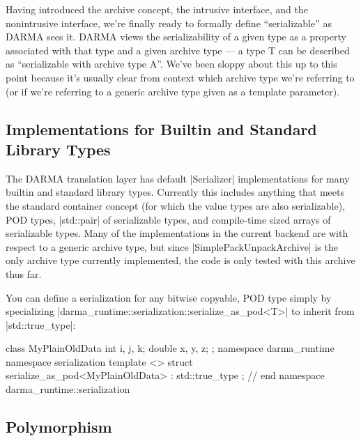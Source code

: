 Having introduced the archive concept, the intrusive interface, and the
nonintrusive interface, we're finally ready to formally define ``serializable''
as DARMA sees it.  DARMA views the serializability of a given type as a property
associated with that type and a given archive type --- a type T can be described
as ``serializable with archive type A''.  We've been sloppy about this up to
this point because it's usually clear from context which archive type we're
referring to (or if we're referring to a generic archive type given as a
template parameter).  

\subsection{Implementations for Builtin and Standard Library Types}

The DARMA translation layer has default |Serializer| implementations for many
builtin and standard library types.  Currently this includes anything that meets
the standard container \gls{concept} (for which the value types are also
serializable), POD types, |std::pair| of serializable types, and
compile-time sized arrays of serializable types.  Many of the implementations in
the current backend are with respect to a generic archive type, but since
|SimplePackUnpackArchive| is the only archive type currently implemented,
the code is only tested with this archive thus far.


You can define a serialization for any bitwise copyable, POD type simply by
specializing |darma_runtime::serialization::serialize_as_pod<T>| to inherit from
|std::true_type|:
\begin{CppCodeNumb}
class MyPlainOldData {
  int i, j, k;
  double x, y, z; 
};
namespace darma_runtime { namespace serialization {
template <>
struct serialize_as_pod<MyPlainOldData> : std::true_type { };
}} // end namespace darma_runtime::serialization
\end{CppCodeNumb}

\subsection{Polymorphism}

